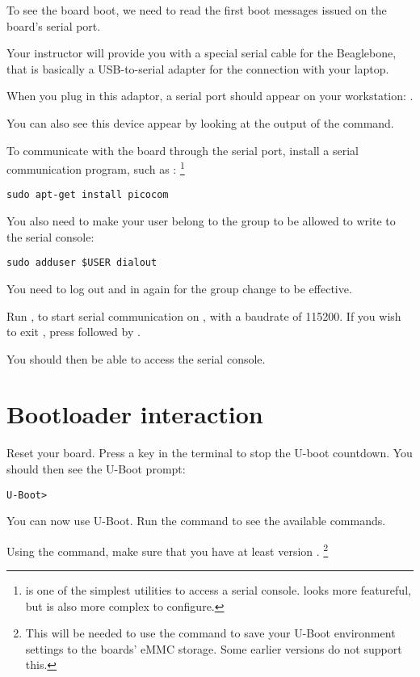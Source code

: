 To see the board boot, we need to read the first boot messages issued
on the board's serial port.

Your instructor will provide you with a special serial cable for the
Beaglebone, that is basically a USB-to-serial adapter for the
connection with your laptop.

When you plug in this adaptor, a serial port should appear on your
workstation: .

You can also see this device appear by looking at the output of the
 command.

To communicate with the board through the serial port, install a
serial communication program, such as :
\footnote{ is one of the simplest utilities to access a
  serial console.  looks more featureful, but is also
  more complex to configure.}

\begin{verbatim}
sudo apt-get install picocom
\end{verbatim}

You also need to make your user belong to the  group to be
allowed to write to the serial console:

\begin{verbatim}
sudo adduser $USER dialout
\end{verbatim}

You need to log out and in again for the group change to be effective.

Run , to start serial
communication on , with a baudrate of 115200. If
you wish to exit , press \code{[Ctrl][a]} followed by
\code{[Ctrl][x]}.

You should then be able to access the serial console.

\section{Bootloader interaction}

Reset your board. Press a key in the  terminal to stop the
U-boot countdown. You should then see the U-Boot prompt:
\begin{verbatim}
U-Boot>
\end{verbatim}

You can now use U-Boot. Run the  command to see the available
commands.

Using the  command, make sure that you have at least
version .
\footnote{This will be needed to use the  command to
save your U-Boot environment settings to the boards' eMMC storage.
Some earlier versions do not support this.}


